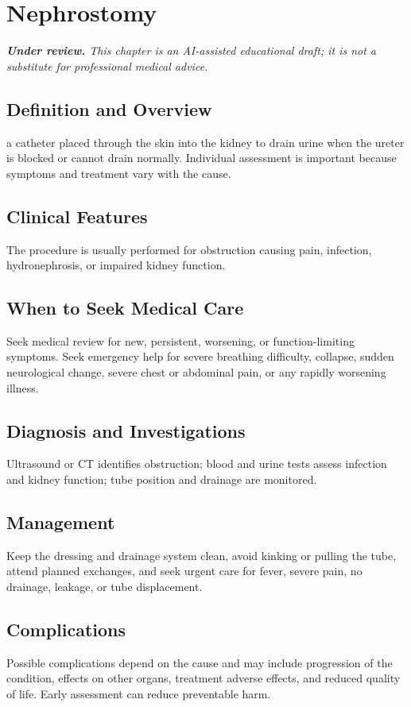 \chapter{Nephrostomy}

\medskip
\noindent\textit{\textbf{Under review.} This chapter is an AI-assisted educational draft; it is not a substitute for professional medical advice.}

\section*{Definition and Overview}
a catheter placed through the skin into the kidney to drain urine when the ureter is blocked or cannot drain normally. Individual assessment is important because symptoms and treatment vary with the cause.

\section*{Clinical Features}
The procedure is usually performed for obstruction causing pain, infection, hydronephrosis, or impaired kidney function.

\section*{When to Seek Medical Care}
Seek medical review for new, persistent, worsening, or function-limiting symptoms. Seek emergency help for severe breathing difficulty, collapse, sudden neurological change, severe chest or abdominal pain, or any rapidly worsening illness.

\section*{Diagnosis and Investigations}
Ultrasound or CT identifies obstruction; blood and urine tests assess infection and kidney function; tube position and drainage are monitored.

\section*{Management}
Keep the dressing and drainage system clean, avoid kinking or pulling the tube, attend planned exchanges, and seek urgent care for fever, severe pain, no drainage, leakage, or tube displacement.

\section*{Complications}
Possible complications depend on the cause and may include progression of the condition, effects on other organs, treatment adverse effects, and reduced quality of life. Early assessment can reduce preventable harm.


